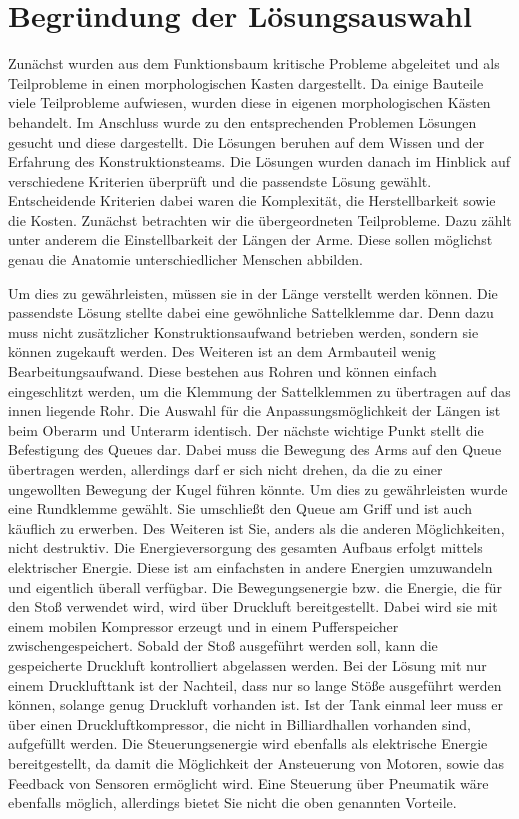 \chapter{Begründung der Lösungsauswahl}\label{Begründung Loesungsauswahl}

	Zunächst wurden aus dem Funktionsbaum kritische Probleme abgeleitet und als Teilprobleme in einen morphologischen Kasten dargestellt.
	Da einige Bauteile viele Teilprobleme aufwiesen, wurden diese in eigenen morphologischen Kästen behandelt.
	Im Anschluss wurde zu den entsprechenden Problemen Lösungen gesucht und diese dargestellt.
	Die Lösungen beruhen auf dem Wissen und der Erfahrung des Konstruktionsteams.
	Die Lösungen wurden danach im Hinblick auf verschiedene Kriterien überprüft und die passendste Lösung gewählt.
	Entscheidende Kriterien dabei waren die Komplexität, die Herstellbarkeit sowie die Kosten. 
	Zunächst betrachten wir die übergeordneten Teilprobleme. 
	Dazu zählt unter anderem die Einstellbarkeit der Längen der Arme.
	Diese sollen möglichst genau die Anatomie unterschiedlicher Menschen abbilden.\par
	Um dies zu gewährleisten, müssen sie in der Länge verstellt werden können.
	Die passendste Lösung stellte dabei eine gewöhnliche Sattelklemme dar.
	Denn dazu muss nicht zusätzlicher Konstruktionsaufwand betrieben werden, sondern sie können zugekauft werden.
	Des Weiteren ist an dem Armbauteil wenig Bearbeitungsaufwand.
	Diese bestehen aus Rohren und können einfach eingeschlitzt werden, um die Klemmung der Sattelklemmen zu übertragen auf das innen liegende Rohr.
	Die Auswahl für die Anpassungsmöglichkeit der Längen ist beim Oberarm und Unterarm identisch. 
	Der nächste wichtige Punkt stellt die Befestigung des Queues dar.
	Dabei muss die Bewegung des Arms auf den Queue übertragen werden, allerdings darf er sich nicht drehen, da die zu einer ungewollten Bewegung der Kugel führen könnte.
	Um dies zu gewährleisten wurde eine Rundklemme gewählt.
	Sie umschließt den Queue am Griff und ist auch käuflich zu erwerben.
	Des Weiteren ist Sie, anders als die anderen Möglichkeiten, nicht destruktiv. 
	Die Energieversorgung des gesamten Aufbaus erfolgt mittels elektrischer Energie.
	Diese ist am einfachsten in andere Energien umzuwandeln und eigentlich überall verfügbar. 
	Die Bewegungsenergie bzw. die Energie, die für den Stoß verwendet wird, wird über Druckluft bereitgestellt.
	Dabei wird sie mit einem mobilen Kompressor erzeugt und in einem Pufferspeicher zwischengespeichert.
	Sobald der Stoß ausgeführt werden soll, kann die gespeicherte Druckluft kontrolliert abgelassen werden.
	Bei der Lösung mit nur einem Drucklufttank ist der Nachteil, dass nur so lange Stöße ausgeführt werden können, solange genug Druckluft vorhanden ist.
	Ist der Tank einmal leer muss er über einen Druckluftkompressor, die nicht in Billiardhallen vorhanden sind, aufgefüllt werden. 
	Die Steuerungsenergie wird ebenfalls als elektrische Energie bereitgestellt, da damit die Möglichkeit der Ansteuerung von Motoren, sowie das Feedback von Sensoren ermöglicht wird.
	Eine Steuerung über Pneumatik wäre ebenfalls möglich, allerdings bietet Sie nicht die oben genannten Vorteile. 

